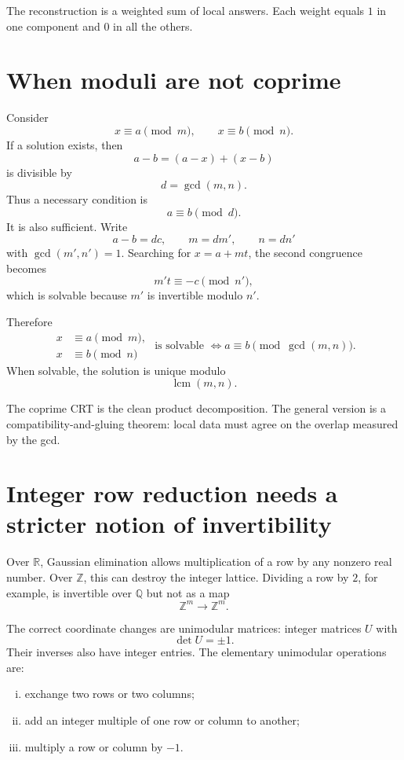 The reconstruction is a weighted sum of local answers.  Each weight equals \(1\) in one component and \(0\) in all the others.

\section{When moduli are not coprime}

Consider
\[
  x\equiv a\pmod m,
  \qquad
  x\equiv b\pmod n.
\]
If a solution exists, then
\[
  a-b
  =(a-x)+(x-b)
\]
is divisible by
\[
  d=\gcd(m,n).
\]
Thus a necessary condition is
\[
  a\equiv b\pmod d.
\]
It is also sufficient.  Write
\[
  a-b=dc,
  \qquad
  m=dm',
  \qquad
  n=dn'
\]
with \(\gcd(m',n')=1\).  Searching for \(x=a+mt\), the second congruence becomes
\[
  m't\equiv-c\pmod{n'},
\]
which is solvable because \(m'\) is invertible modulo \(n'\).

Therefore
\[
  \boxed{
  \begin{aligned}
  x&\equiv a\pmod m,\\
  x&\equiv b\pmod n
  \end{aligned}
  \text{ is solvable }
  \Longleftrightarrow
  a\equiv b\pmod{\gcd(m,n)}.}
\]
When solvable, the solution is unique modulo
\[
  \operatorname{lcm}(m,n).
\]

The coprime CRT is the clean product decomposition.  The general version is a compatibility-and-gluing theorem: local data must agree on the overlap measured by the gcd.

\section{Integer row reduction needs a stricter notion of invertibility}

Over \(\mathbb R\), Gaussian elimination allows multiplication of a row by any nonzero real number.  Over \(\mathbb Z\), this can destroy the integer lattice.  Dividing a row by \(2\), for example, is invertible over \(\mathbb Q\) but not as a map
\[
  \mathbb Z^m\longrightarrow\mathbb Z^m.
\]

The correct coordinate changes are unimodular matrices: integer matrices \(U\) with
\[
  \det U=\pm1.
\]
Their inverses also have integer entries.  The elementary unimodular operations are:

\begin{enumerate}[(i)]
  \item exchange two rows or two columns;
  \item add an integer multiple of one row or column to another;
  \item multiply a row or column by \(-1\).
\end{enumerate}

